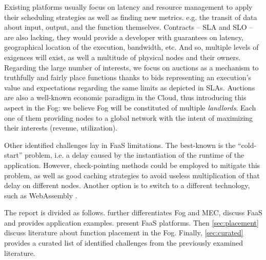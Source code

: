 \documentclass[11pt]{sdm}
\begin{document}
Existing platforms usually focus on latency and resource management to apply their scheduling strategies as well as finding new metrics. e.g. the transit of data about input, output, and the function themselves. Contracts -- \gls{SLA} and \gls{SLO} -- are also lacking, they would provide a developer with guarantees on latency, geographical location of the execution, bandwidth, etc. And so, multiple levels of exigences will exist, as well a multitude of physical nodes and their owners. Regarding the large number of interests, we focus on auctions as a mechanism to truthfully and fairly place functions thanks to bids representing an execution's value and expectations regarding the same limits as depicted in \glspl{SLA}. Auctions are also a well-known economic paradigm in the Cloud, thus introducing this aspect in the Fog: we believe Fog will be constituted of multiple \emph{landlords}. Each one of them providing nodes to a global network with the intent of maximizing their interests (revenue, utilization).


Other identified challenges lay in \gls{FaaS} limitations. The best-known is the ``cold-start'' problem, i.e. a delay caused by the instantiation of the runtime of the application. However, check-pointing methods could be employed to mitigate this problem, as well as good caching strategies to avoid useless multiplication of that delay on different nodes. Another option is to switch to a different technology, such as WebAssembly \cite{hykes_solomon_2019}.

The report is divided as follows.  further differentiates Fog and \gls{MEC}, discuss \gls{FaaS} and provides application examples.  present \gls{FaaS} platforms. Then \cref{sec:placement} discuss literature about function placement in the Fog. Finally, \cref{sec:curated} provides a curated list of identified challenges from the previously examined literature.

\end{document}
